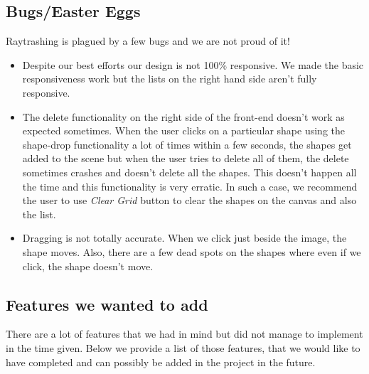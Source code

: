 \documentclass[10pt]{scrartcl}
\begin{document}
\subsection{Bugs/Easter Eggs}
Raytrashing is plagued by a few bugs and we are not proud of it!
\begin{itemize}
    \item Despite our best efforts our design is not 100\% responsive. We made the basic responsiveness work but the lists on the right hand side aren't fully responsive.
    \item The delete functionality on the right side of the front-end doesn't work as expected sometimes. When the user clicks on a particular shape using the shape-drop functionality a lot of times within a few seconds, the shapes get added to the scene but when the user tries to delete all of them, the delete sometimes crashes and doesn't delete all the shapes. This doesn't happen all the time and this functionality is very erratic. In such a case, we recommend the user to use \textit{Clear Grid} button to clear the shapes on the canvas and also the list.
    \item Dragging is not totally accurate. When we click just beside the image, the shape moves. Also, there are a few dead spots on the shapes where even if we click, the shape doesn't move.
\end{itemize}

\subsection{Features we wanted to add}

There are a lot of features that we had in mind but did not manage to implement in the time given. Below we provide a list of those features, that we would like to have completed and can possibly be added in the project in the future.
\end{document}
